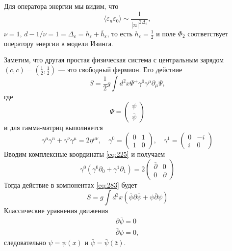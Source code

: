 \documentclass[a4paper,12pt]{article}
\theoremstyle{definition}
\theoremstyle{definition}
\theoremstyle{definition}
\begin{document}
Для оператора энергии мы видим, что
\begin{equation}
  \label{eq:281}
  \langle\varepsilon_{n}\varepsilon_{0}\rangle\sim \frac{1}{|n|^{2\Delta_{\varepsilon}}},
\end{equation}
$\nu=1$, $d-1/\nu=1=\Delta_{\varepsilon}=h_{\varepsilon}+\bar h_{\varepsilon}$, то есть $h_{\varepsilon}=\frac{1}{2}$ и поле $\Phi_{2}$ соответствует оператору энергии в модели Изинга.

Заметим, что другая простая физическая система с центральным зарядом $(c,\bar c)=\left(\frac{1}{2},\frac{1}{2}\right)$ --- это свободный фермион. Его действие
\begin{equation}
  \label{eq:282}
  S=\frac{1}{2} g \int d^{2}x\Psi^{+}\gamma^{0}\gamma^{\mu}\partial_{\mu}\Psi,
\end{equation}
где
\begin{equation}
  \label{eq:283}
  \Psi=
  \begin{pmatrix}
    \psi\\ \bar \psi
  \end{pmatrix}
\end{equation}
и для гамма-матриц выполняется
\begin{equation}
  \label{eq:284}
  \gamma^{\mu}\gamma^{n}+\gamma^{\nu}\gamma^{\mu}=2\eta^{\mu\nu},\quad \gamma^{0}=
  \begin{pmatrix}
    0 & 1\\
    1 & 0
  \end{pmatrix}, \quad
  \gamma^{1}=
  \begin{pmatrix}
    0 & -i\\
    i & 0
  \end{pmatrix}
\end{equation}
Вводим комплексные координаты \eqref{eq:225} и получаем
\begin{equation}
  \label{eq:285}
  \gamma^{0}(\gamma^{0}\partial_{0}+\gamma^{1}\partial_{1})=2
  \begin{pmatrix}
    \bar \partial & 0\\
    0 & \partial
  \end{pmatrix}
\end{equation}
Тогда действие в компонентах \eqref{eq:283} будет
\begin{equation}
  \label{eq:286}
  S=g\int d^{2}x (\bar \psi \partial \bar \psi + \psi\bar \partial \psi)
\end{equation}
Классические уравнения движения
\begin{eqnarray}
  \label{eq:287}
  \partial \bar \psi=0\\
  \bar \partial \psi=0, 
\end{eqnarray}
следовательно $\psi=\psi(x)$ и $\bar \psi=\bar \psi(\bar z)$. 
\end{document}
